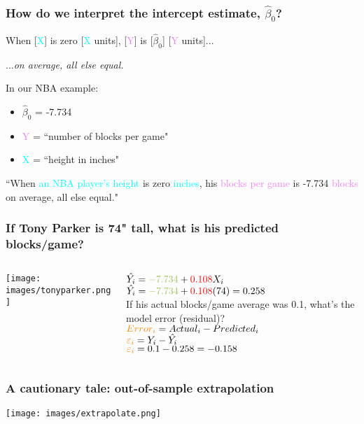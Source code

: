 \documentclass[11pt]{beamer}
\newcommand{\red}{\textcolor{red}}
\newcommand{\orange}{\textcolor{orange}}
\newcommand{\purple}{\textcolor{violet}}
\newcommand{\cyan}{\textcolor{cyan}}
\newcommand{\greenn}{\textcolor{ao}}
\begin{document}
\begin{frame}
\frametitle{How do we interpret the \alert{intercept} estimate, $\hat{\beta}_0$?}
\begin{tcolorbox}[]
	When [\cyan{X}] is zero [\cyan{X} units],  [\purple{Y}] is [\greenn{$\hat{\beta}_0$}] [\purple{Y} units]... 
	\begin{flushright}
		...\textit{on average, all else equal.}
	\end{flushright}
\end{tcolorbox}
In our NBA example:
\begin{itemize}
	\item \greenn{$\hat{\beta}_0$} = -7.734
	\item \purple{Y} = ``number of blocks per game"
	\item \cyan{X} = ``height in inches"
\end{itemize}  \pause \bigskip
``When \cyan{an NBA player's height} is zero \cyan{inches}, his \purple{blocks per game} is \greenn{-7.734} \purple{blocks} on average, all else equal."
\end{frame}

\begin{frame}
\frametitle{If Tony Parker is 74" tall, what is his predicted blocks/game?}
\begin{columns}
	\begin{column}{0.5\textwidth}
		\texttt{[image: images/tonyparker.png]}
	\end{column}
	\begin{column}{0.5\textwidth}
		$\hat{Y_i} = \greenn{-7.734} + \red{0.108}X_i $ \pause \\
		$\hat{Y_i} = \greenn{-7.734} + \red{0.108}(74) = 0.258 $ \\ \pause \bigskip
		If his actual blocks/game average was 0.1, what's the model error (residual)? \\ \pause \bigskip
		$\orange{Error_i} = Actual_i - Predicted_i$ \\ 
		$\orange{\varepsilon_i} = Y_i - \hat{Y_i}$ \\ \pause
		$\orange{\varepsilon_i} = 0.1 - 0.258 = -0.158$
	\end{column}
\end{columns}
\end{frame}

\begin{frame}
\frametitle{A cautionary tale: out-of-sample extrapolation}
\begin{center}
	\texttt{[image: images/extrapolate.png]}
\end{center}
\end{frame}
\end{document}
